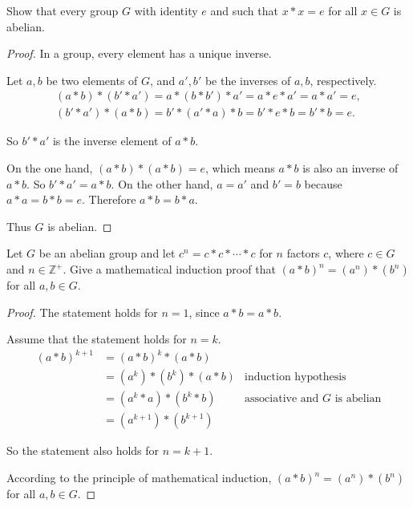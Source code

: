 \begin{exercise}
    Show that every group $G$ with identity $e$ and such that $x * x = e$ for all $x\in G$ is abelian.
\end{exercise}

\begin{proof}
    In a group, every element has a unique inverse.

    Let $a, b$ be two elements of $G$, and $a', b'$ be the inverses of $a, b$, respectively.
    \[
        \begin{split}
            (a * b) * (b' * a') = a * (b * b') * a' = a * e * a' = a * a' = e, \\
            (b' * a') * (a * b) = b' * (a' * a) * b = b' * e * b = b' * b = e.
        \end{split}
    \]

    So $b' * a'$ is the inverse element of $a * b$.

    On the one hand, $(a * b) * (a * b) = e$, which means $a * b$ is also an inverse of $a * b$. So $b' * a' = a * b$. On the other hand, $a = a'$ and $b' = b$ because $a * a = b * b = e$. Therefore $a * b = b * a$.

    Thus $G$ is abelian.
\end{proof}

\begin{exercise}
    Let $G$ be an abelian group and let $c^{n} = c * c * \cdots * c$ for $n$ factors $c$, where $c\in G$ and $n\in\mathbb{Z}^{+}$. Give a mathematical induction proof that ${(a * b)}^{n} = (a^{n}) * (b^{n})$ for all $a, b\in G$.
\end{exercise}

\begin{proof}
    The statement holds for $n = 1$, since $a * b = a * b$.

    Assume that the statement holds for $n = k$.
    \begin{align*}
        {(a * b)}^{k+1} & = {(a * b)}^{k} * (a * b)                                             \\
                        & = (a^{k}) * (b^{k}) * (a * b) & \text{induction hypothesis}           \\
                        & = (a^{k} * a) * (b^{k} * b)   & \text{associative and $G$ is abelian} \\
                        & = (a^{k+1}) * (b^{k+1})
    \end{align*}

    So the statement also holds for $n = k + 1$.

    According to the principle of mathematical induction, ${(a * b)}^{n} = (a^{n}) * (b^{n})$ for all $a, b\in G$.
\end{proof}

